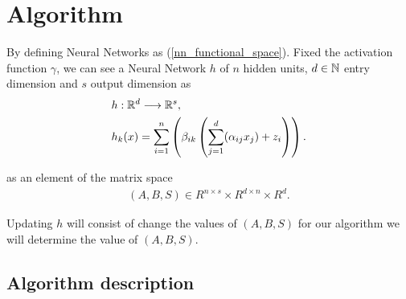 \section*{Algorithm} 

By defining Neural Networks as (\ref{nn_functional_space}).  Fixed the activation function 
$\gamma$, we can see a Neural Network $h$ of $n$ hidden 
units, $d \in \mathbb{N}$ entry dimension and $s$ output
dimension as 
\begin{align}
    &h: \mathbb{R}^d \longrightarrow \mathbb{R}^s,\\
    &h_k(x) = \sum_{i= 1}^n 
        \left(
            \beta_{i k} 
            \left( 
                \sum_{j = 1}^d
                (
                    \alpha_{i j} x_j
                ) + z_i
            \right)
        \right).
\end{align}

as an element of the matrix space 
\begin{align}
    (A,B,S) \in R^{n \times s} \times R^{d \times n} \times R^{d}.
\end{align} 

Updating $h$ will consist of change the values of $(A,B,S)$ for our algorithm we will determine the value of 
$(A,B,S)$. 

\subsection*{Algorithm description}